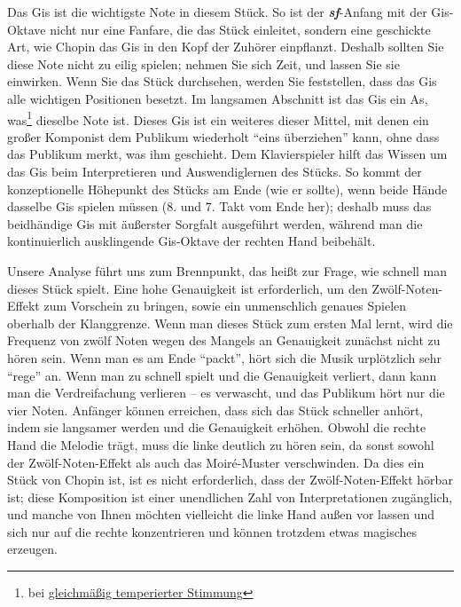 Das Gis ist die wichtigste Note in diesem Stück.
So ist der \textit{\textbf{sf}}-Anfang mit der Gis-Oktave nicht nur eine Fanfare, die das Stück einleitet, sondern eine geschickte Art, wie Chopin das Gis in den Kopf der Zuhörer einpflanzt.
Deshalb sollten Sie diese Note nicht zu eilig spielen; nehmen Sie sich Zeit, und lassen Sie sie einwirken.
Wenn Sie das Stück durchsehen, werden Sie feststellen, dass das Gis alle wichtigen Positionen besetzt.
Im langsamen Abschnitt ist das Gis ein As, was\footnote{bei \hyperref[et1]{gleichmäßig temperierter Stimmung}} dieselbe Note ist.
Dieses Gis ist ein weiteres dieser Mittel, mit denen ein großer Komponist dem Publikum wiederholt \enquote{eins überziehen} kann, ohne dass das Publikum merkt, was ihm geschieht.
Dem Klavierspieler hilft das Wissen um das Gis beim Interpretieren und Auswendiglernen des Stücks.
So kommt der konzeptionelle Höhepunkt des Stücks am Ende (wie er sollte), wenn beide Hände dasselbe Gis spielen müssen (8. und 7. Takt vom Ende her); deshalb muss das beidhändige Gis mit äußerster Sorgfalt ausgeführt werden, während man die kontinuierlich ausklingende Gis-Oktave der rechten Hand beibehält.

Unsere Analyse führt uns zum Brennpunkt, das heißt zur Frage, wie schnell man dieses Stück spielt.
Eine hohe Genauigkeit ist erforderlich, um den Zwölf-Noten-Effekt zum Vorschein zu bringen, sowie ein unmenschlich genaues Spielen oberhalb der Klanggrenze.
Wenn man dieses Stück zum ersten Mal lernt, wird die Frequenz von zwölf Noten wegen des Mangels an Genauigkeit zunächst nicht zu hören sein.
Wenn man es am Ende \enquote{packt}, hört sich die Musik urplötzlich sehr \enquote{rege} an.
Wenn man zu schnell spielt und die Genauigkeit verliert, dann kann man die Verdreifachung verlieren --  es verwascht, und das Publikum hört nur die vier Noten.
Anfänger können erreichen, dass sich das Stück schneller anhört, indem sie langsamer werden und die Genauigkeit erhöhen.
Obwohl die rechte Hand die Melodie trägt, muss die linke deutlich zu hören sein, da sonst sowohl der Zwölf-Noten-Effekt als auch das Moiré-Muster verschwinden.
Da dies ein Stück von Chopin ist, ist es nicht erforderlich, dass der Zwölf-Noten-Effekt hörbar ist; diese Komposition ist einer unendlichen Zahl von Interpretationen zugänglich, und manche von Ihnen möchten vielleicht die linke Hand außen vor lassen und sich nur auf die rechte konzentrieren und können trotzdem etwas magisches erzeugen.


